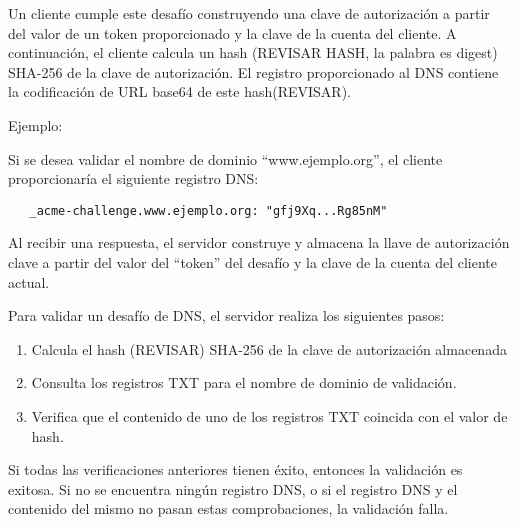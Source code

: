 Un cliente cumple este desafío construyendo una clave de autorización a partir del 
valor de un token proporcionado y la clave de la cuenta del cliente. A continuación, el 
cliente calcula un hash (REVISAR HASH, la palabra es digest) SHA-256 de la clave de 
autorización.
El registro proporcionado al DNS contiene la codificación de URL base64 de este 
hash(REVISAR). 

\noindent Ejemplo:

Si se desea validar el nombre de dominio “www.ejemplo.org”, el cliente 
proporcionaría el siguiente registro DNS:

\begin{verbatim}
   _acme-challenge.www.ejemplo.org: "gfj9Xq...Rg85nM"
\end{verbatim}

Al recibir una respuesta, el servidor construye y almacena la llave de autorización
clave a partir del valor del “token” del desafío y la clave de la cuenta del cliente actual.

\noindent Para validar un desafío de DNS, el servidor realiza los siguientes pasos:

\begin{enumerate}
   \item Calcula el hash (REVISAR) SHA-256 de la clave de autorización almacenada
   \item Consulta los registros TXT para el nombre de dominio de validación.
   \item Verifica que el contenido de uno de los registros TXT coincida con el valor de hash.
\end{enumerate}

   
Si todas las verificaciones anteriores tienen éxito, entonces la validación es exitosa. 
Si no se encuentra ningún registro DNS, o si el registro DNS y el contenido del mismo 
no pasan estas comprobaciones, la validación falla.